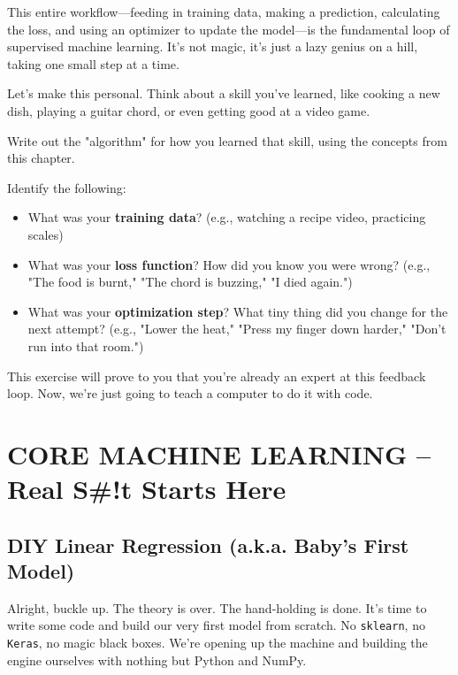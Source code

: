 \documentclass[11pt, letterpaper, openany]{book}
\begin{document}
This entire workflow—feeding in training data, making a prediction, calculating the loss, and using an optimizer to update the model—is the fundamental loop of supervised machine learning. It's not magic, it's just a lazy genius on a hill, taking one small step at a time.

\begin{challengebox}
Let's make this personal. Think about a skill you've learned, like cooking a new dish, playing a guitar chord, or even getting good at a video game.

Write out the "algorithm" for how you learned that skill, using the concepts from this chapter.

Identify the following:
\begin{itemize}
    \item What was your \textbf{training data}? (e.g., watching a recipe video, practicing scales)
    \item What was your \textbf{loss function}? How did you know you were wrong? (e.g., "The food is burnt," "The chord is buzzing," "I died again.")
    \item What was your \textbf{optimization step}? What tiny thing did you change for the next attempt? (e.g., "Lower the heat," "Press my finger down harder," "Don't run into that room.")
\end{itemize}
This exercise will prove to you that you're already an expert at this feedback loop. Now, we're just going to teach a computer to do it with code.
\end{challengebox}

\part{CORE MACHINE LEARNING – Real S\#!t Starts Here}

\chapter{DIY Linear Regression (a.k.a. Baby's First Model)}

Alright, buckle up. The theory is over. The hand-holding is done. It's time to write some code and build our very first model from scratch. No \texttt{sklearn}, no \texttt{Keras}, no magic black boxes. We're opening up the machine and building the engine ourselves with nothing but Python and NumPy.
\end{document}
